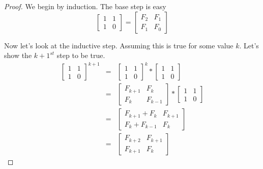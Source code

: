 \documentclass[10 pt]{amsart}
\theoremstyle{definition}
\theoremstyle{remark}
\numberwithin{equation}{subsection}
\begin{document}
\begin{proof}
We begin by induction.  The base step is easy
\[
\begin{bmatrix}
1&1\\
1&0
\end{bmatrix}=\begin{bmatrix}
F_2&F_1\\
F_1&F_0
\end{bmatrix}
\]

Now let's look at the inductive step.  Assuming this is true for some value $k$.  Let's show the $k+1^{st}$ step to be true.
\begin{eqnarray*}
\begin{bmatrix}
1&1\\
1&0
\end{bmatrix}^{k+1} &=& 
\begin{bmatrix}
1&1\\
1&0
\end{bmatrix}^k * 
\begin{bmatrix}
1&1\\
1&0
\end{bmatrix}\\
&=& \begin{bmatrix}
F_{k+1}&F_k\\
F_k&F_{k-1}
\end{bmatrix}*
\begin{bmatrix}
1&1\\
1&0
\end{bmatrix}\\
&=& \begin{bmatrix}
F_{k+1}+F_k& F_{k+1}\\
F_{k}+F_{k-1} & F_k
\end{bmatrix}\\
&=&\begin{bmatrix}
F_{k+2}&F_{k+1}\\
F_{k+1}&F_{k}
\end{bmatrix}
\end{eqnarray*}
\end{proof}
\end{document}
